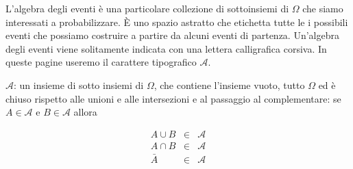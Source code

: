 \documentclass[
  11pt,
]{book}
\theoremstyle{mytheoremstyle}
\theoremstyle{mydefstyle}
\begin{document}
L'algebra degli eventi è una particolare collezione di sottoinsiemi di
\(\Omega\) che siamo interessati a probabilizzare. È uno spazio astratto
che etichetta tutte le i possibili eventi che possiamo costruire a
partire da alcuni eventi di partenza. Un'algebra degli eventi viene
solitamente indicata con una lettera calligrafica corsiva. In queste
pagine useremo il carattere tipografico \(\mathscr{A}\).

\(\mathscr{A}\): un insieme di sotto insiemi di \(\Omega\), che contiene
l'insieme vuoto, tutto \(\Omega\) ed è chiuso rispetto alle unioni e alle
intersezioni e al passaggio al complementare: se \(A\in\mathscr{A}\) e
\(B\in\mathscr{A}\) allora

\begin{eqnarray*}
  A\cup B &\in& \mathscr{A}\\
  A\cap B &\in& \mathscr{A}\\
  \bar A &\in& \mathscr{A}
  \end{eqnarray*}
\end{document}
